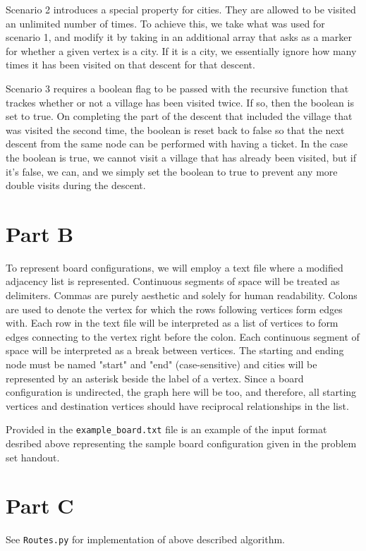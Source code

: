 \documentclass[12pt]{article}
\begin{document}
Scenario 2 introduces a special property for cities. They are allowed to be visited an unlimited number of times. To achieve this, we take what was used for scenario 1, and modify it by taking in an additional array that asks as a marker for whether a given vertex is a city. If it is a city, we essentially ignore how many times it has been visited on that descent for that descent.

Scenario 3 requires a boolean flag to be passed with the recursive function that trackes whether or not a village has been visited twice. If so, then the boolean is set to true. On completing the part of the descent that included the village that was visited the second time, the boolean is reset back to false so that the next descent from the same node can be performed with having a ticket. In the case the boolean is true, we cannot visit a village that has already been visited, but if it's false, we can, and we simply set the boolean to true to prevent any more double visits during the descent.

\section*{Part B}
To represent board configurations, we will employ a text file where a modified adjacency list is represented. Continuous segments of space will be treated as delimiters. Commas are purely aesthetic and solely for human readability. Colons are used to denote the vertex for which the rows following vertices form edges with. Each row in the text file will be interpreted as a list of vertices to form edges connecting to the vertex right before the colon. Each continuous segment of space will be interpreted as a break between vertices. The starting and ending node must be named "start" and "end" (case-sensitive) and cities will be represented by an asterisk beside the label of a vertex. Since a board configuration is undirected, the graph here will be too, and therefore, all starting vertices and destination vertices should have reciprocal relationships in the list.

Provided in the \verb|example_board.txt| file is an example of the input format desribed above representing the sample board configuration given in the problem set handout.

\section*{Part C}
See \verb|Routes.py| for implementation of above described algorithm.
\end{document}
